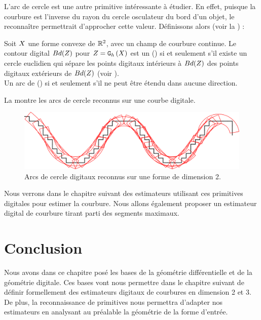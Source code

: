 L'arc de cercle est une autre primitive intéressante à étudier. En effet,
puisque la courbure est l'inverse du rayon du cercle osculateur du bord d'un
objet, le reconnaître permettrait d'approcher cette valeur. Définissons alors
 (voir la ) :
%
\begin{definition}{}
  \label{def:digital-circular-arc}
  Soit $X$ une forme convexe de $\mathbb{R}^2$, avec un champ de courbure continue.
  Le contour digital $Bd({Z})$ pour $Z = \mathtt{G}_{h}\left(X\right)$ est un  () si et seulement s'il existe un cercle euclidien
  qui sépare les points digitaux intérieurs à $Bd({Z})$ des points digitaux
  extérieurs de $Bd({Z})$ (voir ).
  \\
  Un arc de  () si et seulement s'il ne
  peut être étendu dans aucune direction.
\end{definition}

La  montre les arcs de cercle reconnus sur une courbe
digitale.


\begin{figure}[ht]{
    \begin{center}
    \includegraphics[width=13cm]{images/Notions/DCA2}
    \end{center}}
    \caption[Arcs de cercle digitaux reconnus.]{Arcs de cercle digitaux reconnus sur une forme de dimension 2.\label{fig:dca-figure2}}
\end{figure}


Nous verrons dans le chapitre suivant des estimateurs utilisant ces primitives
digitales pour estimer la courbure. Nous allons également proposer un estimateur
digital de courbure tirant parti des segments maximaux.
%
\section{Conclusion}
%
Nous avons dans ce chapitre posé les bases de la géométrie différentielle et de
la géométrie digitale.  Ces bases vont nous permettre dans le chapitre suivant
de définir formellement des estimateurs digitaux de courbures en dimension 2 et
3. De plus, la reconnaissance de primitives nous permettra d'adapter nos
estimateurs en analysant au préalable la géométrie de la forme d'entrée.
